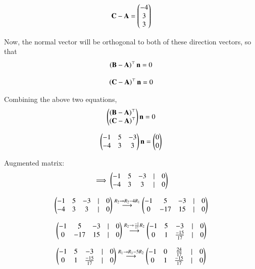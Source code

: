 \documentclass[journal,12pt,onecolumn]{IEEEtran}
\theoremstyle{remark}
\begin{document}
\begin{equation}
\mathbf{C} - \mathbf{A} = \begin{pmatrix}-4\\3\\3\end{pmatrix}
\end{equation}

Now, the normal vector will be orthogonal to both of these direction vectors, so that
\begin{equation}
    \left(\mathbf{B} - \mathbf{A}\right)^{\top}\mathbf{n} = 0
\end{equation}

\begin{equation}
    \left(\mathbf{C} - \mathbf{A}\right)^{\top}\mathbf{n} = 0
\end{equation}

Combining the above two equations,
\begin{equation}
    \begin{pmatrix}\left(\mathbf{B} - \mathbf{A}\right)^{\top}\\ \left(\mathbf{C} - \mathbf{A}\right)^{\top}\end{pmatrix}\mathbf{n} = 0
\end{equation}

\begin{equation}
    \begin{pmatrix}-1&5&-3\\-4&3&3\end{pmatrix}\mathbf{n} = \begin{pmatrix}0\\0\end{pmatrix}
\end{equation}

Augmented matrix:
\begin{equation}
    \implies \begin{pmatrix}-1&5&-3&|&0\\-4&3&3&|&0\end{pmatrix}
\end{equation}

\begin{equation}
    \begin{pmatrix}-1&5&-3&|&0\\-4&3&3&|&0\end{pmatrix} \overset{R_2 \rightarrow R_2 - 4R_1}{\longrightarrow} \begin{pmatrix}-1&5&-3&|&0\\0&-17&15&|&0\end{pmatrix}
\end{equation}

\begin{equation}
    \begin{pmatrix}-1&5&-3&|&0\\0&-17&15&|&0\end{pmatrix} \overset{R_2 \rightarrow \frac{-1}{17}R_2}{\longrightarrow} \begin{pmatrix}-1&5&-3&|&0\\0&1&\frac{-15}{17}&|&0\end{pmatrix}
\end{equation}

\begin{equation}
    \begin{pmatrix}-1&5&-3&|&0\\0&1&\frac{-15}{17}&|&0\end{pmatrix} \overset{R_1 \rightarrow R_1 - 5R_2}{\longrightarrow} \begin{pmatrix}-1&0&\frac{24}{17}&|&0\\0&1&\frac{-15}{17}&|&0\end{pmatrix}
\end{equation}
\end{document}
